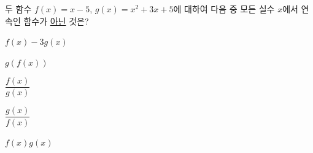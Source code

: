두 함수 $f(x)=x-5$, $g(x)=x^2+3x+5$에 대하여 다음 중 모든 실수 $x$에서 연속인 함수가 \underline{아닌} 것은?
\begin{choices32}{\rule[-3ex]{0pt}{8ex}$f(x)-3g(x)$}{\rule[-3ex]{0pt}{8ex}$g(f(x))$}{\rule[-3ex]{0pt}{8ex}$\dfrac{f(x)}{g(x)}$}{\rule[-3ex]{0pt}{8ex}$\dfrac{g(x)}{f(x)}$}{\rule[-3ex]{0pt}{8ex}$f(x)g(x)$}\end{choices32}
